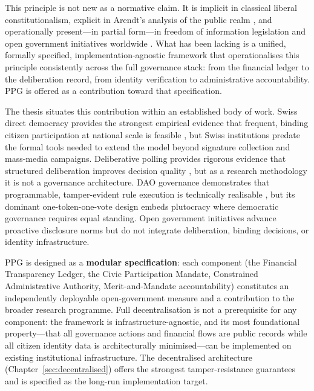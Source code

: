 \documentclass[12pt,a4paper,oneside]{report}
\begin{document}
This principle is not new as a normative claim. It is implicit in classical liberal constitutionalism, explicit in Arendt's analysis of the public realm \citep{arendt1958human}, and operationally present---in partial form---in freedom of information legislation and open government initiatives worldwide \citep{oecd2020open}. What has been lacking is a unified, formally specified, implementation-agnostic framework that operationalises this principle consistently across the full governance stack: from the financial ledger to the deliberation record, from identity verification to administrative accountability. PPG is offered as a contribution toward that specification.

The thesis situates this contribution within an established body of work. Swiss direct democracy provides the strongest empirical evidence that frequent, binding citizen participation at national scale is feasible \citep{linder2010swiss}, but Swiss institutions predate the formal tools needed to extend the model beyond signature collection and mass-media campaigns. Deliberative polling provides rigorous evidence that structured deliberation improves decision quality \citep{fishkin2018stanford}, but as a research methodology it is not a governance architecture. DAO governance demonstrates that programmable, tamper-evident rule execution is technically realisable \citep{hassan2021decentralized}, but its dominant one-token-one-vote design embeds plutocracy where democratic governance requires equal standing. Open government initiatives advance proactive disclosure norms \citep{oecd2020open} but do not integrate deliberation, binding decisions, or identity infrastructure.

PPG is designed as a \textbf{modular specification}: each component (the Financial Transparency Ledger, the Civic Participation Mandate, Constrained Administrative Authority, Merit-and-Mandate accountability) constitutes an independently deployable open-government measure and a contribution to the broader research programme. Full decentralisation is not a prerequisite for any component: the framework is infrastructure-agnostic, and its most foundational property---that all governance actions and financial flows are public records while all citizen identity data is architecturally minimised---can be implemented on existing institutional infrastructure. The decentralised architecture (Chapter~\ref{sec:decentralised}) offers the strongest tamper-resistance guarantees and is specified as the long-run implementation target.
\end{document}
